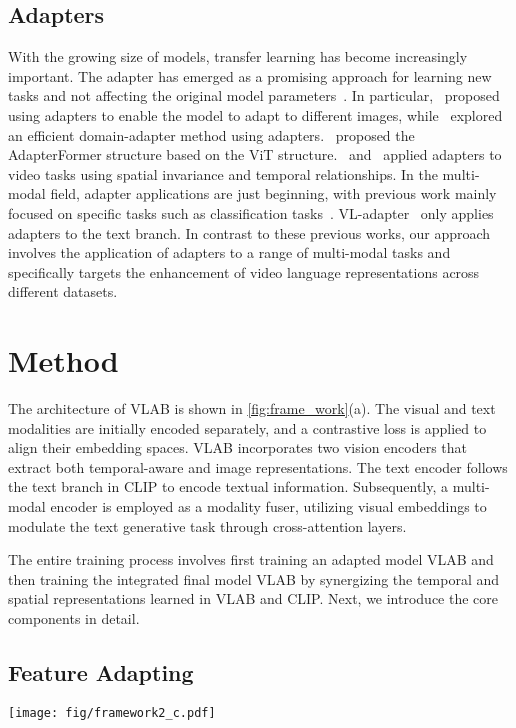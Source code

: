 \documentclass{article}
\begin{document}
\subsection{Adapters}
With the growing size of models, transfer learning has become increasingly important\cite{rebuffi2017learning}. The adapter has emerged as a promising approach for learning new tasks and not affecting the original model parameters~\cite{hu2021lora, sung2022vl, panst}. In particular,~\cite{rebuffi2017learning} proposed using adapters to enable the model to adapt to different images, while~\cite{rebuffi2018efficient} explored an efficient domain-adapter method using adapters.~\cite{chenadaptformer} proposed the AdapterFormer structure based on the ViT structure.~\cite{jie2022convolutional} and~\cite{panst} applied adapters to video tasks using spatial invariance and temporal relationships. In the multi-modal field, adapter applications are just beginning, with previous work mainly focused on specific tasks such as classification tasks~\cite{chenadaptformer,hetowards,jie2022convolutional}. VL-adapter~\cite{sung2022vl} only applies adapters to the text branch. In contrast to these previous works, our approach involves the application of adapters to a range of multi-modal tasks and specifically targets the enhancement of video language representations across different datasets.

\section{Method}
\label{sec:method}

The architecture of VLAB is shown in \cref{fig:frame_work}(a). 
The visual and text modalities are initially encoded separately, and a contrastive loss is applied to align their embedding spaces. VLAB incorporates two vision encoders that extract both temporal-aware and image representations. The text encoder follows the text branch in CLIP to encode textual information. Subsequently, a multi-modal encoder is employed as a modality fuser, utilizing visual embeddings to modulate the text generative task through cross-attention layers. 

The entire training process involves first training an adapted model VLAB and then training the integrated final model VLAB by synergizing the temporal and spatial representations learned in VLAB and CLIP. Next, we introduce the core components in detail.

\subsection{Feature Adapting}
\label{sec:feature_adapting}
\begin{figure*}
\begin{center}
\texttt{[image: fig/framework2\_c.pdf]}
\end{center}
   \caption{(a) Overall framework of VLAB. VLAB handles both contrastive and generative tasks in a unified model. (b) Illustration of the proposed video adapter module in feature adapting. Refer to Sec.~\ref{sec:method} for details.}
\label{fig:frame_work}
\end{figure*}
\end{document}
